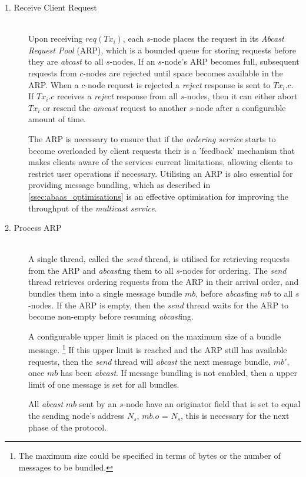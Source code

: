     \begin{description}
        \item[1. Receive Client Request] \hfill \\
            Upon receiving $req(Tx_i)$, each $s$-node places the request in its \emph{Abcast Request Pool} (ARP), which is a bounded queue for storing requests before they are \emph{abcast} to all $s$-nodes.  If an $s$-node's ARP becomes full, subsequent requests from $c$-nodes are rejected until space becomes available in the ARP.  When a $c$-node request is rejected a \emph{reject} response is sent to $Tx_i.c$.  If $Tx_i.c$ receives a \emph{reject} response from all $s$-nodes, then it can either abort $Tx_i$ or resend the \emph{amcast} request to another $s$-node after a configurable amount of time.    
            
            The ARP is necessary to ensure that if the \emph{ordering service} starts to become overloaded by client requests their is a 'feedback' mechanism that makes clients aware of the services current limitations, allowing clients to restrict user operations if necessary.  Utilising an ARP is also essential for providing message bundling, which as described in \ref{ssec:abaas_optimisations} is an effective optimisation for improving the throughput of the \emph{multicast service}.  
            
        \item[2. Process ARP] \hfill \\
        A single thread, called the \emph{send} thread, is utilised for retrieving requests from the ARP and \emph{abcast}ing them to all $s$-nodes for ordering.  The \emph{send} thread retrieves ordering requests from the ARP in their arrival order, and bundles them into a single message bundle $mb$, before \emph{abcast}ing $mb$ to all $s$-nodes.  If the ARP is empty, then the \emph{send} thread waits for the ARP to become non-empty before resuming \emph{abcast}ing.  
		
		A configurable upper limit is placed on the maximum size of a bundle message. \footnote{The maximum size could be specified in terms of bytes or the number of messages to be bundled.} If this upper limit is reached and the ARP still has available requests, then the \emph{send} thread will \emph{abcast} the next message bundle, $mb'$, once $mb$ has been \emph{abcast}.  If message bundling is not enabled, then a upper limit of one message is set for all bundles.    
		
		All \emph{abcast} $mb$ sent by an $s$-node have an originator field that is set to equal the sending node's address $N_s$, $mb.o$ = $N_s$, this is necessary for the next phase of the protocol.  
		

\end{description}
